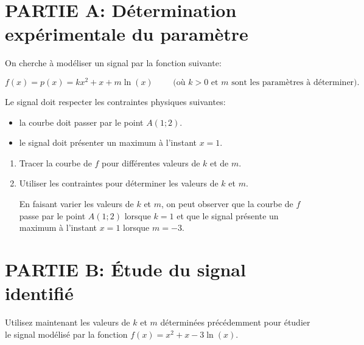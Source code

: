 \documentclass[11pt, a4paper]{report}
\begin{document}
\def\level{BTS}  %
\def\course{CIEL 1}
\def\chaptername{Intégration} %
\def\docname{C107~--~TP4}        %

\pagestyle{DS_FP}

\NomPrenomNote{}

\section*{PARTIE A\@: Détermination expérimentale du paramètre}

On cherche à modéliser un signal par la fonction suivante:  

\[f(x) =  p(x) = kx^2 + x + m\ln(x) \qquad \text{ (où $k>0$ et $m$ sont les paramètres à déterminer).}\]

Le signal doit respecter les contraintes physiques suivantes:

\begin{itemize}
    \item la courbe doit passer par le point $A(1;2)$.
    \item le signal doit présenter un maximum à l'instant $x=1$.
\end{itemize}

\begin{enumerate}
    \item Tracer la courbe de $f$ pour différentes valeurs de $k$ et de $m$. 
    \item Utiliser les contraintes pour déterminer les valeurs de $k$ et $m$. 
    \begin{blocvisible}[height=2]
        En faisant varier les valeurs de $k $ et $m$, on peut observer que la courbe de $f$ passe par le point $A(1;2)$ lorsque $k=1$ et que le signal présente un maximum à l'instant $x=1$ lorsque $m=-3$.
    \end{blocvisible}
\end{enumerate}



\section*{PARTIE B\@: Étude du signal identifié}

Utilisez maintenant les valeurs de $k$ et $m$ déterminées précédemment pour étudier le signal modélisé par la fonction $f(x) = x^2 + x - 3\ln(x)$.
\end{document}
